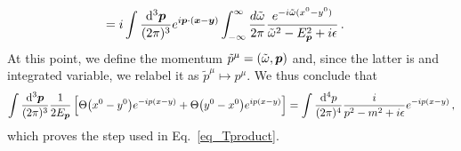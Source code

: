 \begin{sol}
\begin{equation}
\begin{split}
        = &\; i \int \frac{{\rm d}^{3}\boldsymbol{p}}{(2\pi)^{3}} e^{i \boldsymbol{p}\cdot(\boldsymbol{x}-\boldsymbol{y})} \int_{-\infty}^{\infty} \frac{d\tilde{\omega}}{2\pi} \frac{e^{-i \tilde{\omega} (x^0 - y^0)}}{\tilde{\omega}^2 - E_{\boldsymbol{p}}^2 + i\epsilon} \, .
    \end{split}
    \end{equation}
    At this point, we define the momentum $\tilde{p}^\mu = (\tilde{\omega}, \boldsymbol{p})$ and, since the latter is and integrated variable, we relabel it as $\tilde{p}^\mu \mapsto p^\mu$. We thus conclude that
    \begin{equation}
        \int \frac{{\rm d}^{3}\boldsymbol{p}}{(2\pi)^{3}}\frac{1}{2E_{\boldsymbol{p}}} \left[\Theta\big(x^0 - y^0\big)e^{-ip(x-y)} + \Theta\big(y^0 - x^0\big) e^{ip(x-y)}\right] 
        = \int \frac{{\rm d}^{4}p}{(2\pi)^{4}} \frac{i}{p^{2} - m^{2} + i\epsilon} e^{-ip(x-y)} \, ,
    \end{equation}
    which proves the step used in Eq.~\eqref{eq_Tproduct}.
\end{sol}
